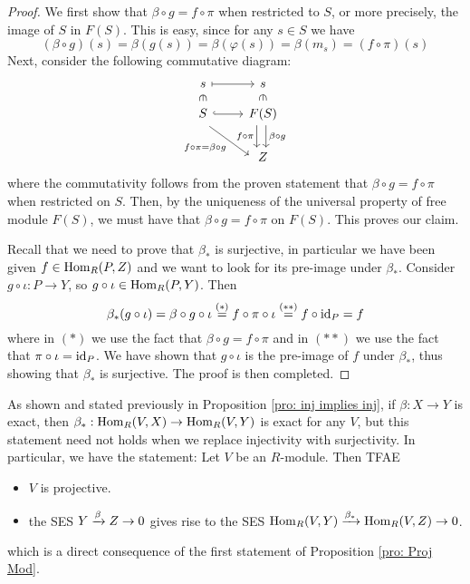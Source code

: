 \begin{proof}
    We first show that $\beta\circ g = f\circ \pi$ when restricted to $S$, or more precisely, the image of $S$ in $F(S)$. This is easy, since for any $s\in S$ we have
    \[(\beta\circ g)(s) = \beta(g(s)) = \beta(\varphi(s))=\beta(m_s) = (f\circ \pi)(s)\]
    Next, consider the following commutative diagram:
    \[\begin{tikzcd}[sep=small]
	s && s \\
	S && {F(S)} \\
	\\
	&& Z
	\arrow[maps to, from=1-1, to=1-3]
	\arrow["\in"{marking, allow upside down}, draw=none, from=1-1, to=2-1]
	\arrow["\in"{marking, allow upside down}, draw=none, from=1-3, to=2-3]
	\arrow[hook, from=2-1, to=2-3]
	\arrow["{f\circ \pi = \beta \circ g}"', shift right=2, from=2-1, to=4-3]
	\arrow["{f\circ \pi}"', shift right=2, from=2-3, to=4-3]
	\arrow["{\beta\circ g}", shift left, from=2-3, to=4-3]
    \end{tikzcd}\]
    where the commutativity follows from the proven statement that $\beta \circ g = f \circ \pi$ when restricted on $S$. Then, by the uniqueness of the universal property of free module $F(S)$, we must have that $\beta\circ g = f \circ \pi$ on $F(S)$. This proves our claim. 

    Recall that we need to prove that $\beta_*$ is surjective, in particular we have been given $f\in \operatorname{Hom}_R(P,Z)$ and we want to look for its pre-image under $\beta_*$. Consider $g\circ \iota:P\to Y$, so $g\circ \iota \in \operatorname{Hom}_R(P,Y)$. Then
    \[\beta_*(g\circ \iota) = \beta\circ g \circ \iota \overset{(*)}{=} f\circ \pi \circ \iota \overset{(**)}{=} f\circ \operatorname{id}_P = f\]
    where in $(*)$ we use the fact that $\beta\circ g = f\circ \pi$ and in $(**)$ we use the fact that $\pi\circ \iota = \operatorname{id}_P$. We have shown that $g\circ \iota$ is the pre-image of $f$ under $\beta_*$, thus showing that $\beta_*$ is surjective. The proof is then completed. 
\end{proof}

\begin{re}
    As shown and stated previously in Proposition \ref{pro: inj implies inj}, if $\beta: X \to Y$ is exact, then $\beta_*: \operatorname{Hom}_R(V,X) \to \operatorname{Hom}_R(V,Y)$ is exact for any $V$, but this statement need not holds when we replace injectivity with surjectivity.  In particular, we have the statement: Let $V$ be an $R$-module. Then TFAE
    \begin{itemize}
        \item $V$ is projective.
        \item the SES $Y \xrightarrow{\beta} Z \to 0$ gives rise to the SES $\operatorname{Hom}_R (V,Y) \xrightarrow{\beta_*} \operatorname{Hom}_R(V,Z)\to 0$.
    \end{itemize}
    which is a direct consequence of the first statement of Proposition \ref{pro: Proj Mod}.
\end{re}

